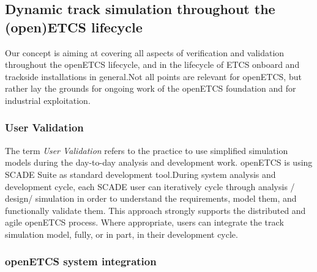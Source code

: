 \documentclass{template/openetcs_article}
\begin{document}
\subsection{Dynamic track simulation throughout the (open)ETCS lifecycle}
Our concept is aiming at covering all aspects of verification and validation throughout the openETCS lifecycle, and in the lifecycle of ETCS onboard and trackside installations in general.\newline Not all points are relevant for openETCS, but rather lay the grounds for ongoing work of the openETCS foundation and for industrial exploitation.

\subsubsection{User Validation}

The term \emph{User Validation} refers to the practice to use simplified simulation models during the day-to-day analysis and development work.\newline
openETCS is using SCADE Suite as standard development tool.\newline During system analysis and development cycle, each SCADE user can iteratively cycle through analysis / design/ simulation in order to understand the requirements, model them, and functionally validate them. This approach strongly supports the distributed and agile openETCS process. \newline Where appropriate, users can integrate the track simulation model, fully, or in part, in their development cycle.

\subsubsection{openETCS system integration}
\end{document}
